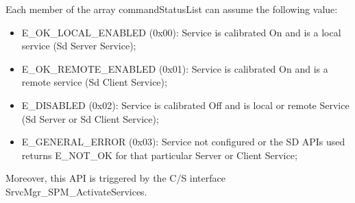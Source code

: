 Each member of the array commandStatusList can assume the following value:
\begin{itemize}
\item E\_OK\_LOCAL\_ENABLED (0x00): Service is calibrated On and is a local service (Sd Server Service); 
\item E\_OK\_REMOTE\_ENABLED (0x01): Service is calibrated On and is a remote service (Sd Client Service);
\item E\_DISABLED (0x02): Service is calibrated Off and is local or remote Service (Sd Server or Sd Client Service);
\item E\_GENERAL\_ERROR (0x03): Service not configured or the SD APIs used returns E\_NOT\_OK for that particular Server or Client Service; 
\end{itemize}

Moreover, this API is triggered by the C/S interface SrvcMgr\_SPM\_ActivateServices. 
